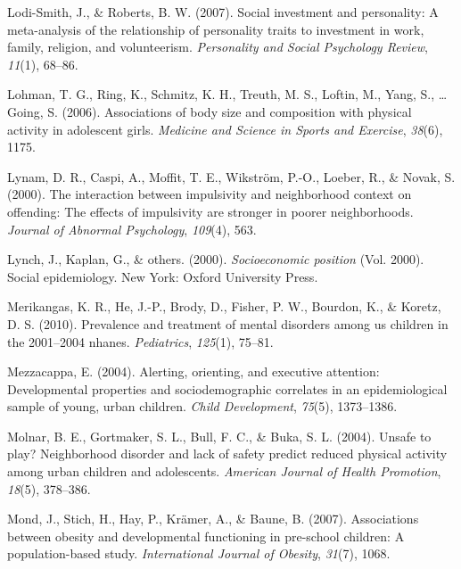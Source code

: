 \documentclass[man]{apa6}
\begin{document}
\leavevmode\hypertarget{ref-lodi2007social}{}%
Lodi-Smith, J., \& Roberts, B. W. (2007). Social investment and personality: A meta-analysis of the relationship of personality traits to investment in work, family, religion, and volunteerism. \emph{Personality and Social Psychology Review}, \emph{11}(1), 68--86.

\leavevmode\hypertarget{ref-lohman2006associations}{}%
Lohman, T. G., Ring, K., Schmitz, K. H., Treuth, M. S., Loftin, M., Yang, S., \ldots{} Going, S. (2006). Associations of body size and composition with physical activity in adolescent girls. \emph{Medicine and Science in Sports and Exercise}, \emph{38}(6), 1175.

\leavevmode\hypertarget{ref-lynam2000interaction}{}%
Lynam, D. R., Caspi, A., Moffit, T. E., Wikström, P.-O., Loeber, R., \& Novak, S. (2000). The interaction between impulsivity and neighborhood context on offending: The effects of impulsivity are stronger in poorer neighborhoods. \emph{Journal of Abnormal Psychology}, \emph{109}(4), 563.

\leavevmode\hypertarget{ref-lynch2000socioeconomic}{}%
Lynch, J., Kaplan, G., \& others. (2000). \emph{Socioeconomic position} (Vol. 2000). Social epidemiology. New York: Oxford University Press.

\leavevmode\hypertarget{ref-merikangas2010prevalence}{}%
Merikangas, K. R., He, J.-P., Brody, D., Fisher, P. W., Bourdon, K., \& Koretz, D. S. (2010). Prevalence and treatment of mental disorders among us children in the 2001--2004 nhanes. \emph{Pediatrics}, \emph{125}(1), 75--81.

\leavevmode\hypertarget{ref-mezzacappa2004alerting}{}%
Mezzacappa, E. (2004). Alerting, orienting, and executive attention: Developmental properties and sociodemographic correlates in an epidemiological sample of young, urban children. \emph{Child Development}, \emph{75}(5), 1373--1386.

\leavevmode\hypertarget{ref-molnar2004unsafe}{}%
Molnar, B. E., Gortmaker, S. L., Bull, F. C., \& Buka, S. L. (2004). Unsafe to play? Neighborhood disorder and lack of safety predict reduced physical activity among urban children and adolescents. \emph{American Journal of Health Promotion}, \emph{18}(5), 378--386.

\leavevmode\hypertarget{ref-mond2007associations}{}%
Mond, J., Stich, H., Hay, P., Krämer, A., \& Baune, B. (2007). Associations between obesity and developmental functioning in pre-school children: A population-based study. \emph{International Journal of Obesity}, \emph{31}(7), 1068.
\end{document}
